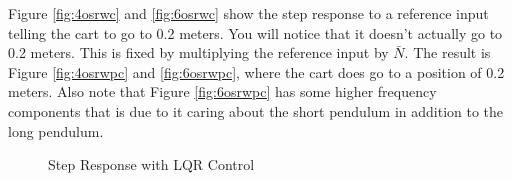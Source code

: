 \documentclass{article}
\begin{document}
Figure \ref{fig:4osrwc} and \ref{fig:6osrwc} show the step response to a reference input telling the cart to go to 0.2 meters. You will notice that it doesn't actually go to 0.2 meters. This is fixed by multiplying the reference input by $\bar{N}$. The result is Figure \ref{fig:4osrwpc} and \ref{fig:6osrwpc}, where the cart does go to a position of 0.2 meters. Also note that Figure \ref{fig:6osrwpc} has some higher frequency components that is due to it caring about the short pendulum in addition to the long pendulum.

\begin{figure}
\centering
{}
\caption{Step Response with LQR Control}
\end{figure}
\end{document}
